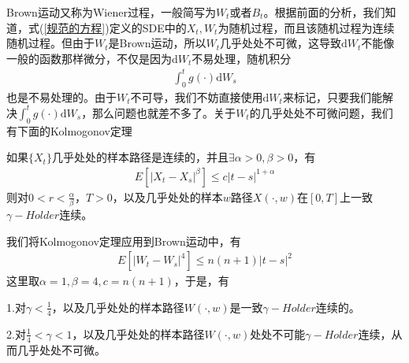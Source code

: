             \par
            Brown运动又称为Wiener过程，一般简写为$W_t$或者$B_t$。根据前面的分析，我们知道，式(\ref{规范的方程})定义的SDE中的$X_t,W_t$为随机过程，而且该随机过程为连续随机过程。但由于$W_t$是Brown运动，所以$W_t$几乎处处不可微，这导致$\mathrm{d}W_t$不能像一般的函数那样微分，不仅是因为$\mathrm{d}W_t$不易处理，随机积分
            \begin{align*}
                \int_0^t g(\cdot) \mathrm{d}W_s
            \end{align*}
            也是不易处理的。由于$W_t$不可导，我们不妨直接使用$\mathrm{d}W_t$来标记，只要我们能解决$\int_0^t g(\cdot) \mathrm{d}W_s$，那么问题也就差不多了。关于$W_t$的几乎处处不可微问题，我们有下面的Kolmogonov定理
            \begin{theorem}[Kolmogonov定理]
            如果$\{X_t\}$几乎处处的样本路径是连续的，并且$\exists \alpha >0 ,\beta > 0$，有
            \begin{align*}
                E[|X_t - X_s|^\beta] \leqslant c|t - s|^{1+\alpha}
            \end{align*}
            则对$0 < r <\frac{\alpha}{\beta}$，$T>0$，以及几乎处处的样本$w$路径$X(\cdot,w)$在$[0,T]$上一致$\gamma - Holder$连续。
            \end{theorem}
            \par
            我们将Kolmogonov定理应用到Brown运动中，有
            \begin{align*}
                E[|W_t - W_s|^4] \leqslant n(n+1)|t - s|^{2}
            \end{align*}
            这里取$\alpha = 1,\beta = 4,c = n(n+1)$，于是，有
            \par
            1.对$\gamma < \frac{1}{4}$，以及几乎处处的样本路径$W(\cdot,w)$是一致$\gamma - Holder$连续的。
            \par
            2.对$\frac{1}{4}<\gamma < 1$，以及几乎处处的样本路径$W(\cdot,w)$处处不可能$\gamma - Holder$连续，从而几乎处处不可微。
